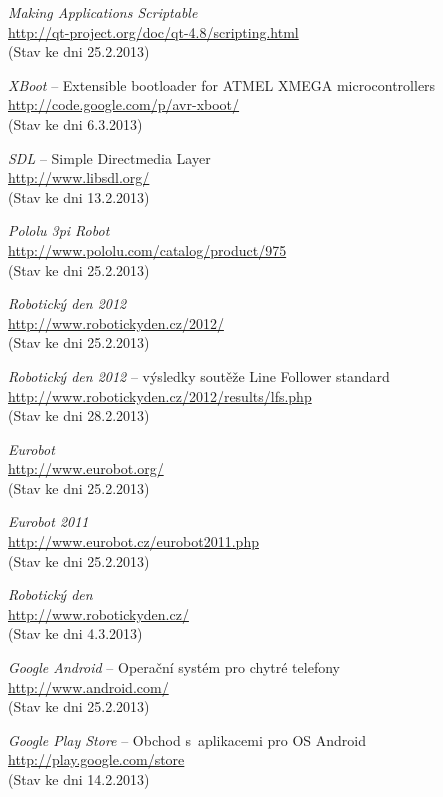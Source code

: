 \documentclass[12pt, a4paper, oneside]{article}
\newcommand{\It}{\textit}  %
\begin{document}
\begin{thebibliography}{99}
     \It{Making Applications Scriptable} \\
    \url{http://qt-project.org/doc/qt-4.8/scripting.html}\\
    (Stav ke dni 25.2.2013)

     \It{XBoot} -- Extensible bootloader for ATMEL XMEGA microcontrollers \\
    \url{http://code.google.com/p/avr-xboot/}\\
    (Stav ke dni 6.3.2013)

     \It{SDL} -- Simple Directmedia Layer \\
    \url{http://www.libsdl.org/}\\
    (Stav ke dni 13.2.2013)

     \It{Pololu 3pi Robot} \\
    \url{http://www.pololu.com/catalog/product/975}\\
    (Stav ke dni 25.2.2013)

     \It{Robotický den 2012} \\
    \url{http://www.robotickyden.cz/2012/}\\
    (Stav ke dni 25.2.2013)

     \It{Robotický den 2012} -- výsledky soutěže Line Follower standard\\
    \url{http://www.robotickyden.cz/2012/results/lfs.php}\\
    (Stav ke dni 28.2.2013)

     \It{Eurobot} \\
    \url{http://www.eurobot.org/}\\
    (Stav ke dni 25.2.2013)

     \It{Eurobot 2011} \\
    \url{http://www.eurobot.cz/eurobot2011.php}\\
    (Stav ke dni 25.2.2013)

     \It{Robotický den} \\
    \url{http://www.robotickyden.cz/}\\
    (Stav ke dni 4.3.2013)

     \It{Google Android} -- Operační systém pro chytré telefony\\
    \url{http://www.android.com/}\\
    (Stav ke dni 25.2.2013)

     \It{Google Play Store} -- Obchod s~aplikacemi pro OS Android\\
    \url{http://play.google.com/store}\\
    (Stav ke dni 14.2.2013)


\end{thebibliography}
\end{document}
